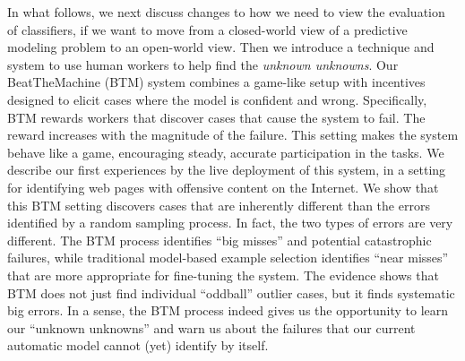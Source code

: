 In what follows, we next discuss
changes to how we need to view the evaluation of classifiers, if we
want to move from a closed-world view of a predictive modeling problem
to an open-world view.  Then we introduce a technique and system to use
human workers to help find the \emph{unknown unknowns}.  Our
BeatTheMachine (BTM) system combines a game-like setup with incentives
designed to elicit cases where the model is confident and wrong.
Specifically, BTM rewards workers that discover cases that cause the
system to fail. The reward increases with the magnitude of the
failure. This setting makes the system behave like a game,
encouraging steady, accurate participation in the tasks. We describe
our first experiences by the live deployment of this system, in a
setting for identifying web pages with offensive content on the
Internet. We show that this BTM setting discovers cases that are
inherently different than the errors identified by a random sampling
process. In fact, the two types of errors are very different. The BTM
process identifies ``big misses'' and potential catastrophic failures,
while traditional model-based example selection identifies ``near
misses'' that are more appropriate for fine-tuning the system.  The
evidence shows that BTM does not just find individual ``oddball''
outlier cases, but it finds systematic big errors.  In a sense, the
BTM process indeed gives us the opportunity to learn our ``unknown
unknowns'' and warn us about the failures that our current automatic
model cannot (yet) identify by itself.


